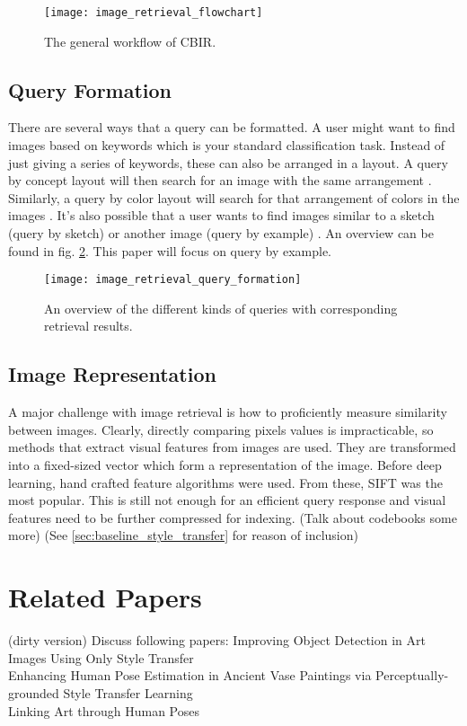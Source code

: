 \begin{figure}
	\centering
	\texttt{[image: image\_retrieval\_flowchart]}%
	\label{fig:image_retrieval_flowchart}
	\caption{
		The general workflow of \gls{CBIR}. \cite{Zhou2017}
	}
\end{figure}

\subsection{Query Formation}
There are several ways that a query can be formatted.
A user might want to find images based on keywords which is your standard classification task.
Instead of just giving a series of keywords, these can also be arranged in a layout.
A query by concept layout will then search for an image with the same arrangement \cite{Xu2010}.
Similarly, a query by color layout will search for that arrangement of colors in the images \cite{Wang2011}.
It's also possible that a user wants to find images similar to a sketch (query by sketch) \cite{Cao2010} or another image (query by example) \cite{Radenovic2017}.
An overview can be found in fig. \ref{fig:image_retrieval_query_formation}.
This paper will focus on query by example.

\begin{figure}
	\centering
	\texttt{[image: image\_retrieval\_query\_formation]}%
	\caption{
		An overview of the different kinds of queries with corresponding retrieval results. \cite{Zhou2017}
	}
	\label{fig:image_retrieval_query_formation}
\end{figure}

\subsection{Image Representation}
A major challenge with image retrieval is how to proficiently measure similarity between images.
Clearly, directly comparing pixels values is impracticable, so methods that extract visual features from images are used.
They are transformed into a fixed-sized vector which form a representation of the image.
Before deep learning, hand crafted feature algorithms were used.
From these, \gls{SIFT} \cite{Lowe1999} was the most popular.
This is still not enough for an efficient query response and visual features need to be further compressed for indexing.
(Talk about codebooks some more)
(See \ref{sec:baseline_style_transfer} for reason of inclusion)

\section{Related Papers}
(dirty version)
Discuss following papers:
Improving Object Detection in Art Images Using Only Style Transfer \cite{Kadish2021}\\
Enhancing Human Pose Estimation in Ancient Vase Paintings via Perceptually-grounded Style Transfer Learning \cite{Madhu2020}\\
Linking Art through Human Poses \cite{Jenicek2019}\\